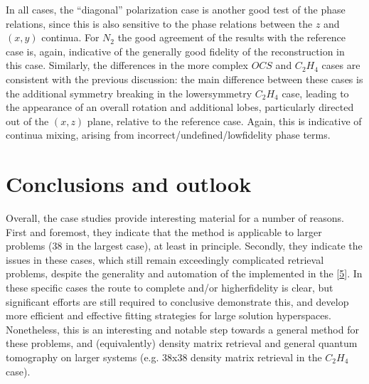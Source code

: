 \documentclass[letterpaper,table,10pt,english]{jupyterBook}
\begin{document}
\sphinxAtStartPar
In all cases, the “diagonal” polarization case is another good test of the phase relations, since this is also sensitive to the phase relations between the \(z\) and \((x,y)\) continua. For \(N_2\) the good agreement of the results with the reference case is, again, indicative of the generally good fidelity of the reconstruction in this case. Similarly, the differences in the more complex \(OCS\) and \(C_2H_4\) cases are consistent with the previous discussion: the main difference between these cases is the additional symmetry breaking in the lower\sphinxhyphen{}symmetry \(C_2H_4\) case, leading to the appearance of an overall rotation and additional lobes, particularly directed out of the \((x,z)\) plane, relative to the reference case. Again, this is indicative of continua mixing, arising from incorrect/undefined/low\sphinxhyphen{}fidelity phase terms.


\section{Conclusions and outlook}
\label{\detokenize{part2/case-study-summaries_240723:conclusions-and-outlook}}
\sphinxAtStartPar
Overall, the case studies provide interesting material for a number of reasons. First and foremost, they indicate that the {\hyperref[\detokenize{backmatter/glossary:term-bootstrap-retrieval-protocol}]{}} method is applicable to larger problems (38 {\hyperref[\detokenize{backmatter/glossary:term-radial-matrix-elements}]{}} in the largest case), at least in principle. Secondly, they indicate the issues in these cases, which still remain exceedingly complicated retrieval problems, despite the generality and automation of the {\hyperref[\detokenize{backmatter/glossary:term-bootstrap-retrieval-protocol}]{}} implemented in the  {[}\hyperlink{cite.backmatter/bibliography:id682}{5}{]}. In these specific cases the route to complete and/or higher\sphinxhyphen{}fidelity {\hyperref[\detokenize{backmatter/glossary:term-bootstrap-retrieval-protocol}]{}} is clear, but significant efforts are still required to conclusive demonstrate this, and develop more efficient and effective fitting strategies for large solution hyperspaces. Nonetheless, this is an interesting and notable step towards a general method for these problems, and (equivalently) density matrix retrieval and general quantum tomography on larger systems (e.g. 38x38 density matrix retrieval in the \(C_2H_4\) case).
\end{document}
